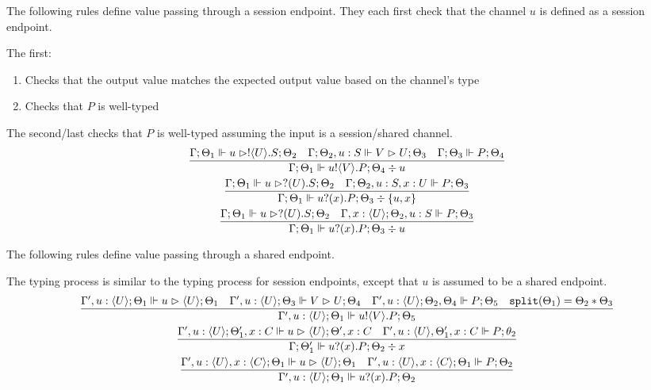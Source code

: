 The following rules define value passing through a session endpoint.
They each first check that the channel $u$ is defined as a session endpoint.

The first:
\begin{enumerate}
\item Checks that the output value matches the expected output value based on the channel's type
\item Checks that $P$ is well-typed
\end{enumerate}

The second/last checks that $P$ is well-typed assuming the input is a session/shared channel.
\begin{gather*}
\frac{\Gamma ; \Theta_1 \Vdash u \vartriangleright !\langle U \rangle . S ; \Theta_2 \quad \Gamma ; \Theta_2 , u : S \Vdash V \vartriangleright U ; \Theta_3 \quad \Gamma ; \Theta_3 \Vdash P ; \Theta_4}{\Gamma ; \Theta_1 \Vdash u ! \langle V \rangle . P ; \Theta_4 \div u} \\
\frac{\Gamma ;\Theta_1 \Vdash u \vartriangleright ?(U).S ; \Theta_2 \quad \Gamma ; \Theta_2 , u : S , x : U \Vdash P ; \Theta_3}{\Gamma ; \Theta_1 \Vdash u ? (x) . P ; \Theta_3 \div \{u,x\}} \\
\frac{\Gamma ; \Theta_1 \Vdash u \vartriangleright ?(U) . S ; \Theta_2 \quad \Gamma, x : \langle U \rangle ; \Theta_2 , u : S \Vdash P ; \Theta_3}{\Gamma ; \Theta_1 \Vdash u? (x) . P ; \Theta_3 \div u}
\end{gather*}

The following rules define value passing through a shared endpoint.

The typing process is similar to the typing process for session endpoints, except that $u$ is assumed to be a shared endpoint.
\begin{gather*}
\frac{\Gamma' , u : \langle U \rangle ; \Theta_1 \Vdash u \vartriangleright \langle U \rangle ; \Theta_1 \quad \Gamma' , u : \langle U \rangle ; \Theta_3 \Vdash V \vartriangleright U ; \Theta_4 \quad \Gamma', u : \langle U \rangle ; \Theta_2, \Theta_4 \Vdash P ; \Theta_5 \quad \texttt{split}(\Theta_1) = \Theta_2 * \Theta_3}{\Gamma', u : \langle U \rangle ; \Theta_1 \Vdash u ! \langle V \rangle . P ; \Theta_5} \\
\frac{\Gamma' , u : \langle U \rangle ; \Theta_1', x : C \Vdash u \vartriangleright \langle U \rangle ; \Theta' , x : C \quad \Gamma' , u : \langle U \rangle , \Theta_1', x : C \Vdash P ; \theta_2}{\Gamma ; \Theta_1' \Vdash u ? (x) . P ; \Theta_2 \div x} \\
\frac{\Gamma' , u : \langle U \rangle , x : \langle C \rangle ; \Theta_1 \Vdash u \vartriangleright \langle U \rangle ; \Theta_1 \quad \Gamma' , u : \langle U \rangle , x : \langle C \rangle ; \Theta_1 \Vdash P ; \Theta_2}{\Gamma', u : \langle U \rangle ; \Theta_1 \Vdash u ? (x) . P ; \Theta_2} \\
\end{gather*}

